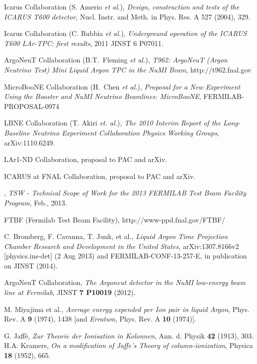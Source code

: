 \documentclass[DIV=calc, paper=a4, fontsize=10pt, twocolumn]{scrartcl}	 %
\begin{document}
\begin{thebibliography}{00}
\label{bibliogr}
{\footnotesize

 Icarus Collaboration (S. Amerio {\it et al.}), \emph{Design, construction and tests of the ICARUS T600 detector},
Nucl. Instr. and Meth. in Phys. Res. A 527 (2004), 329.

 Icarus Collaboration (C. Rubbia {\it et al.}), \emph{Underground operation of the ICARUS T600
LAr-TPC: first results}, 2011 JINST 6 P07011.

 ArgoNeuT Collaboration (B.T.~Fleming {\it et al.}), 
\emph{T962: ArgoNeuT (Argon Neutrino Test) Mini Liquid Argon TPC in the NuMI Beam},  
http://t962.fnal.gov

  MicroBooNE Collaboration (H.~Chen {\it et al.}), 
\emph{Proposal for a New Experiment Using the Booster and NuMI Neutrino
  Beamlines: MicroBooNE}, FERMILAB-PROPOSAL-0974
 
 LBNE Collaboration (T. Akiri {\it et. al.}), 
\emph{The 2010 Interim Report of the Long-Baseline Neutrino
Experiment Collaboration Physics Working Groups}, arXiv:1110.6249.

 LAr1-ND Collaboration, proposal to PAC and arXiv.

 ICARUS at FNAL Collaboration, proposal to PAC and arXiv.

,
\emph{TSW - Technical Scope of Work
for the 2013 FERMILAB Test Beam Facility Program}, Feb., 2013.

 FTBF (Fermilab Test Beam Facility), http://www-ppd.fnal.gov/FTBF/

 C. Bromberg, F. Cavanna, T. Junk, et al.,
\emph{Liquid Argon Time Projection Chamber Research and Development in the United
States},
arXiv:1307.8166v2 [physics.ins-det] (2 Aug 2013) and FERMILAB-CONF-13-257-E,
in publication on JINST (2014).

 {\sf ArgoNeuT} Collaboration,
\emph{The Argoneut detector in the NuMI low-energy beam line at Fermilab}, 
	JINST {\bf 7 P10019} (2012). 

 M. Miyajima  et al., 
\emph{Average energy expended per Ion pair in liquid Argon},
Phys. Rev. A {\bf 9} (1974), 1438 [and {\it Erratum}, Phys. Rev. A {\bf 10} (1974)]. 

G. Jaff\`e, 
\emph{Zur Theorie der Ionisation in Kolonnen}, Ann. d. Physik  {\bf 42} (1913), 303.\\
H.A. Kramers, 
\emph{On a modification of Jaffe's Theory of column-ionization},
Physica {\bf 18} (1952), 665.

}
\end{thebibliography}
\end{document}
